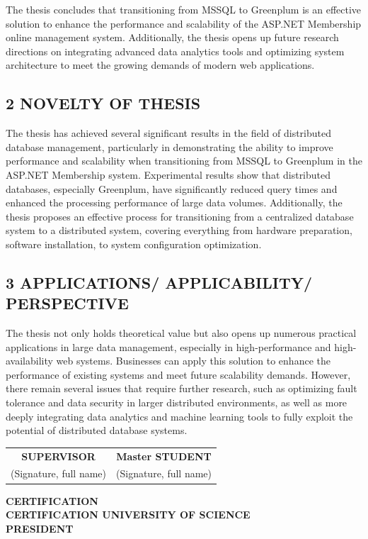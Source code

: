 \documentclass{article}[13pt]
\begin{document}
The thesis concludes that transitioning from MSSQL to Greenplum is an effective solution to enhance the performance and scalability of the ASP.NET Membership online management system. Additionally, the thesis opens up future research directions on integrating advanced data analytics tools and optimizing system architecture to meet the growing demands of modern web applications.


\subsection*{2 NOVELTY OF THESIS}
The thesis has achieved several significant results in the field of distributed database management, particularly in demonstrating the ability to improve performance and scalability when transitioning from MSSQL to Greenplum in the ASP.NET Membership system. Experimental results show that distributed databases, especially Greenplum, have significantly reduced query times and enhanced the processing performance of large data volumes. Additionally, the thesis proposes an effective process for transitioning from a centralized database system to a distributed system, covering everything from hardware preparation, software installation, to system configuration optimization.


\subsection*{3 APPLICATIONS/ APPLICABILITY/ PERSPECTIVE}

The thesis not only holds theoretical value but also opens up numerous practical applications in large data management, especially in high-performance and high-availability web systems. Businesses can apply this solution to enhance the performance of existing systems and meet future scalability demands. However, there remain several issues that require further research, such as optimizing fault tolerance and data security in larger distributed environments, as well as more deeply integrating data analytics and machine learning tools to fully exploit the potential of distributed database systems.

\begin{center}
    \begin{tabular}{c c}
        \textbf{SUPERVISOR} & \textbf{Master STUDENT} \\
        (Signature, full name) & (Signature, full name) \\
    \end{tabular}
    
    \vspace{6cm} %
    
    \textbf{CERTIFICATION} \\
    \textbf{CERTIFICATION UNIVERSITY OF SCIENCE} \\
    \textbf{PRESIDENT}
\end{center}
\end{document}
